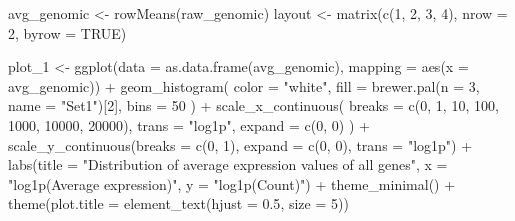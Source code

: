 \documentclass[
  letterpaper,
  DIV=11,
  numbers=noendperiod]{scrartcl}
\newenvironment{Shaded}{\begin{snugshade}}{\end{snugshade}}
\newcommand{\AttributeTok}[1]{\textcolor[rgb]{0.40,0.45,0.13}{#1}}
\newcommand{\ConstantTok}[1]{\textcolor[rgb]{0.56,0.35,0.01}{#1}}
\newcommand{\DecValTok}[1]{\textcolor[rgb]{0.68,0.00,0.00}{#1}}
\newcommand{\FloatTok}[1]{\textcolor[rgb]{0.68,0.00,0.00}{#1}}
\newcommand{\FunctionTok}[1]{\textcolor[rgb]{0.28,0.35,0.67}{#1}}
\newcommand{\NormalTok}[1]{\textcolor[rgb]{0.00,0.23,0.31}{#1}}
\newcommand{\OtherTok}[1]{\textcolor[rgb]{0.00,0.23,0.31}{#1}}
\newcommand{\SpecialCharTok}[1]{\textcolor[rgb]{0.37,0.37,0.37}{#1}}
\newcommand{\StringTok}[1]{\textcolor[rgb]{0.13,0.47,0.30}{#1}}
\begin{document}
\begin{Shaded}
\begin{Highlighting}[]
\NormalTok{avg\_genomic }\OtherTok{\textless{}{-}} \FunctionTok{rowMeans}\NormalTok{(raw\_genomic)}
\NormalTok{layout }\OtherTok{\textless{}{-}} \FunctionTok{matrix}\NormalTok{(}\FunctionTok{c}\NormalTok{(}\DecValTok{1}\NormalTok{, }\DecValTok{2}\NormalTok{, }\DecValTok{3}\NormalTok{, }\DecValTok{4}\NormalTok{), }\AttributeTok{nrow =} \DecValTok{2}\NormalTok{, }\AttributeTok{byrow =} \ConstantTok{TRUE}\NormalTok{)}

\NormalTok{plot\_1 }\OtherTok{\textless{}{-}} \FunctionTok{ggplot}\NormalTok{(}\AttributeTok{data =} \FunctionTok{as.data.frame}\NormalTok{(avg\_genomic), }\AttributeTok{mapping =}  \FunctionTok{aes}\NormalTok{(}\AttributeTok{x =}\NormalTok{ avg\_genomic)) }\SpecialCharTok{+}
  \FunctionTok{geom\_histogram}\NormalTok{(}
    \AttributeTok{color =} \StringTok{"white"}\NormalTok{,}
    \AttributeTok{fill =} \FunctionTok{brewer.pal}\NormalTok{(}\AttributeTok{n =} \DecValTok{3}\NormalTok{, }\AttributeTok{name =} \StringTok{"Set1"}\NormalTok{)[}\DecValTok{2}\NormalTok{],}
    \AttributeTok{bins =} \DecValTok{50}
\NormalTok{  ) }\SpecialCharTok{+}
  \FunctionTok{scale\_x\_continuous}\NormalTok{(}
    \AttributeTok{breaks =} \FunctionTok{c}\NormalTok{(}\DecValTok{0}\NormalTok{, }\DecValTok{1}\NormalTok{, }\DecValTok{10}\NormalTok{, }\DecValTok{100}\NormalTok{, }\DecValTok{1000}\NormalTok{, }\DecValTok{10000}\NormalTok{, }\DecValTok{20000}\NormalTok{),}
    \AttributeTok{trans =} \StringTok{"log1p"}\NormalTok{,}
    \AttributeTok{expand =} \FunctionTok{c}\NormalTok{(}\DecValTok{0}\NormalTok{, }\DecValTok{0}\NormalTok{)}
\NormalTok{  ) }\SpecialCharTok{+}
  \FunctionTok{scale\_y\_continuous}\NormalTok{(}\AttributeTok{breaks =} \FunctionTok{c}\NormalTok{(}\DecValTok{0}\NormalTok{, }\DecValTok{1}\NormalTok{),}
                     \AttributeTok{expand =} \FunctionTok{c}\NormalTok{(}\DecValTok{0}\NormalTok{, }\DecValTok{0}\NormalTok{),}
                     \AttributeTok{trans =} \StringTok{"log1p"}\NormalTok{) }\SpecialCharTok{+}
  \FunctionTok{labs}\NormalTok{(}\AttributeTok{title =} \StringTok{"Distribution of average expression values of all genes"}\NormalTok{,}
       \AttributeTok{x =} \StringTok{"log1p(Average expression)"}\NormalTok{,}
       \AttributeTok{y =} \StringTok{"log1p(Count)"}\NormalTok{) }\SpecialCharTok{+}
  \FunctionTok{theme\_minimal}\NormalTok{() }\SpecialCharTok{+}
  \FunctionTok{theme}\NormalTok{(}\AttributeTok{plot.title =} \FunctionTok{element\_text}\NormalTok{(}\AttributeTok{hjust =} \FloatTok{0.5}\NormalTok{, }\AttributeTok{size =} \DecValTok{5}\NormalTok{))}


\end{Highlighting}
\end{Shaded}
\end{document}
